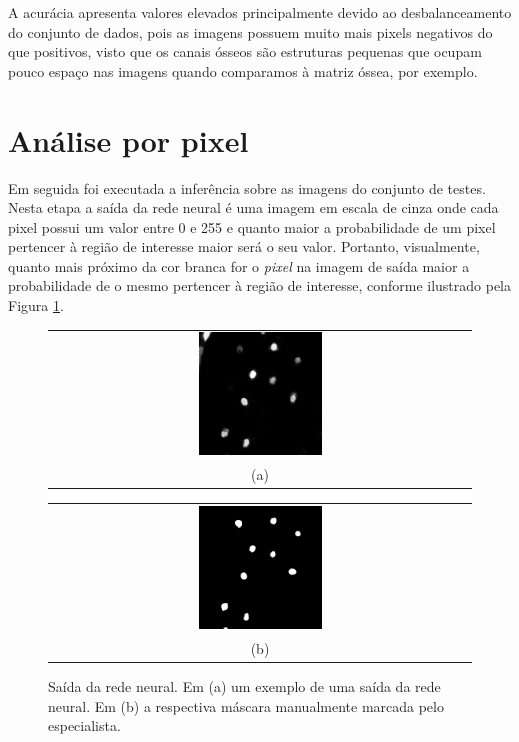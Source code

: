 A acurácia apresenta valores elevados principalmente devido ao desbalanceamento do conjunto de dados, pois as imagens possuem muito mais pixels negativos do que positivos, visto que os canais ósseos são estruturas pequenas que ocupam pouco espaço nas imagens quando comparamos à matriz óssea, por exemplo. 

\section{Análise por pixel}

Em seguida foi executada a inferência sobre as imagens do conjunto de testes. Nesta etapa a saída da rede neural é uma imagem em escala de cinza onde cada pixel possui um valor entre 0 e 255 e quanto maior a probabilidade de um pixel pertencer à região de interesse maior será o seu valor. Portanto, visualmente, quanto mais próximo da cor branca for o \textit{pixel} na imagem de saída maior a probabilidade de o mesmo pertencer à região de interesse, conforme ilustrado pela Figura \ref{fig:masks-result-and-original-640-202-r2c1}.

\begin{figure}[h]
    \center
    \begin{tabular}{@{}c@{}}
        \includegraphics[width=0.3\textwidth]{figures/4_results/network_640_mask.png}
        \\[\abovecaptionskip]
    \small (a)
    \end{tabular}
    \begin{tabular}{@{}c@{}}
        \includegraphics[width=0.3\textwidth]{figures/4_results/manual_640_mask.png}
        \\[\abovecaptionskip]
    \small (b)
    \end{tabular}
    \caption[Saída da rede neural.]{Saída da rede neural. Em (a) um exemplo de uma saída da rede neural. Em (b) a respectiva máscara manualmente marcada pelo especialista.}
    \label{fig:masks-result-and-original-640-202-r2c1}
\end{figure}

